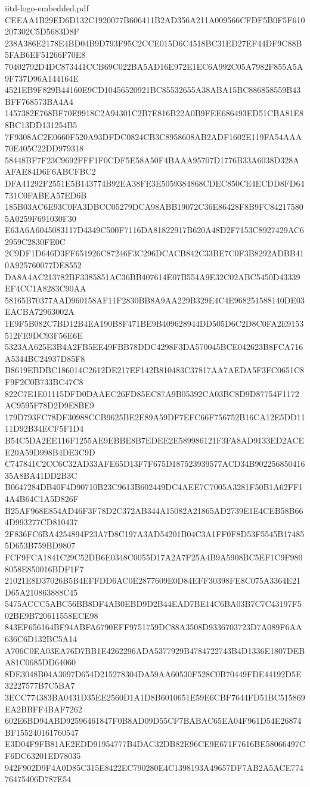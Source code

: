 \begin{filecontents*}[overwrite]{iitd-logo-embedded.pdf}
CEEAA1B29ED6D132C1920077B606411B2AD356A211A009566CFDF5B0F5F610207302C5D5683D8F
238A386E2178E4BD04B9D793F95C2CCE015D6C4518BC31ED27EF44DF9C88B5FAB6EF51266F70E8
70402792D4DC873441CCB69C022BA5AD16E972E1EC6A992C05A7982F855A5A9F737D96A144164E
4521EB9F829B44160E9CD10456520921BC85532655A38ABA15BC886858559B43BFF768573BA4A4
1457382E768BF70E9918C2A94301C2B7E816B22A0B9FEE686493ED51CBA81E88BC13DD131254B5
7F9308AC2E0660F520A93DFDC0824CB3C8958608AB2ADF1602E119FA54AAA70E405C22DD979318
58448BF7F23C9692FFF1F0CDF5E58A50F4BAAA95707D1776B33A6038D328AAFAE84D6F6ABCFBC2
DFA41292F2551E5B143774B92EA38FE3E5059384868CDEC850CE4ECDD8FD64731C0FABEA57ED6B
185B03AC6E93C0FA3DBCC05279DCA98ABB19072C36E86428F8B9FC842175805A0259F691030F30
E63A6A6045083117D4349C500F7116DA81822917B620A48D2F7153C8927429AC62959C2830FE0C
2C9DF1D646D3FF651926C87246F3C296DCACB842C33BE7C0F3B8292ADBB410A925760077DE8552
DA8A4AC213782BF3385851AC36BB407614E07B554A9E32C02ABC5450D43339EF4CC1A8283C90AA
58165B70377AAD960158AF11F2830BB8A9AA229B329E4C4E968251588140DE03EACBA72963002A
1E9F5B082C7BD12B4EA190B8F471BE9B409628944DD505D6C2D8C0FA2E9153512FE9DC93F56E6E
5323AA625E3B4A2FB5EE49FBB78DDC4298F3DA570045BCE042623B8FCA716A5344BC24937D85F8
B8619EBDBC186014C2612DE217EF142B810483C37817AA7AEDA5F3FC0651C8F9F2C0B733BC47C8
822C7E1E01115DFD0DAAEC26FD85EC87A9B05392CA03BC8D9D87754F1172AC9595F78D2D9E8BE9
179D793FC78DF30988CCB9625BE2E89A59DF7EFC66F756752B16CA12E5DD1111D92B34ECF5F1D4
B54C5DA2EE116F1255AE9EBBE8B7EDEE2E589986121F3FA8AD9133ED2ACEE20A59D998B4DE3C9D
C747841C2CC6C32AD33AFE65D13F7F675D187523939577ACD34B90225685041635A8BA41DD2B3C
B0647284DB40F4D90710B23C9613B602449DC4AEE7C7005A3281F50B1A62FF14A4B64C1A5D826F
B25AF968E854AD46F3F78D2C372AB344A15082A21865AD2739E1E4CEB58B664D993277CD810437
2F836FC6BA4254894F23A7D8C197A3AD54201B04C3A1FF0F8D53F5545B174855D653B759BD9807
FCF9FCA1841C29C52DB6E0348C0055D17A2A7F25A4B9A5908BC5EF1C9F9808058E850016BDF1F7
21021E8D37026B5B4EFFDD6AC0E2877609E0D84EFF30398FE8C075A3364E21D65A210863888C45
5475ACCC5ABC56BB8DF4AB0EBD9D2B44EAD7BE14C6BA03B7C7C43197F502BE9B720611558ECE98
843EF656164BF94ABFA6790EFF9751759DC88A3508D9336703723D7A089F6AA636C6D132BC5A14
A706C0EA03EA76D7BB1E4262296ADA5377929B4784722743B4D1336E1807DEBA81C0685DD64060
8DE3048B04A3097D654D215278304DA59AA60530F528C0B70449FDE44192D5E32227577B7C5BA7
3ECC774383BA0431D35EE2560D1A1D8B6010651E59E6CBF7644FD51BC515869EA2BBFF4BAF7262
602E6BD94ABD92596461847F0B8AD09D55CF7BABAC65EA04F961D54E26874BF155240161760547
E3D04F9FB81AE2EDD91954777B4DAC32DB82E96CE9E671F7616BE58066497CF6DC63201ED78035
942F902D9F4A0D85C315E8422EC790280E4C1398193A49657DF7AB2A5ACE77476475406D787E54

\end{filecontents*}
